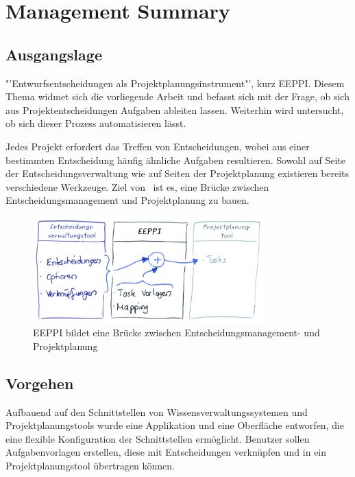 \chapter{Management Summary}
	\captionsetup[figure]{labelformat=empty} %

	
	\section{Ausgangslage}
	
	"'Entwurfsentscheidungen als Projektplanungsinstrument"', kurz EEPPI. 
	Diesem Thema widmet sich die vorliegende Arbeit und befasst sich mit der Frage, 
	ob sich aus Projektentscheidungen Aufgaben ableiten lassen.
	Weiterhin wird untersucht, ob sich dieser Prozess automatisieren lässt.
	
	Jedes Projekt erfordert das Treffen von Entscheidungen, wobei aus einer bestimmten Entscheidung häufig ähnliche Aufgaben resultieren.
	Sowohl auf Seite der Entscheidungsverwaltung wie auf Seiten der Projektplanung existieren bereits verschiedene Werkzeuge.
	Ziel von \eeppi\ ist es, eine Brücke zwischen Entscheidungsmanagement und Projektplanung zu bauen.
	
	\begin{figure}[H]
		\includegraphics[width=0.8\textwidth]{introduction/img/eeppiVision.png}
		\centering
		\caption{EEPPI bildet eine Brücke zwischen Entscheidungsmanagement- und Projektplanung}
		\label{fig:eeppiBridgeBetweenDecisionsAndTasks}
	\end{figure}
	
	
	\section{Vorgehen}
	
	Aufbauend auf den Schnittstellen von Wissensverwaltungssystemen und Projektplanungstools wurde eine Applikation und eine Oberfläche entworfen,
	die eine flexible Konfiguration der Schnittstellen ermöglicht.
	Benutzer sollen Aufgabenvorlagen erstellen, diese mit Entscheidungen verknüpfen und in ein Projektplanungstool übertragen können.
	
